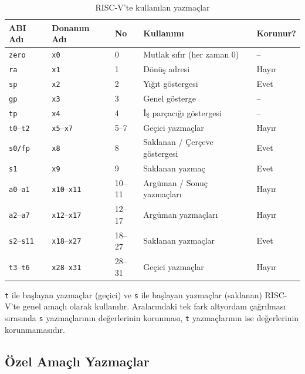 \begin{table}[H]
\centering
\caption{RISC-V'te kullanılan yazmaçlar}
\label{tab:riscv-yazmaclar}
\small
\begin{tabular}{lllp{5.5cm}l}
\toprule
\textbf{ABI Adı} & \textbf{Donanım Adı} & \textbf{No} & \textbf{Kullanımı} & \textbf{Korunur?} \\
\midrule
\texttt{zero}      & \texttt{x0}      & 0     & Mutlak sıfır (her zaman 0)       & -- \\
\texttt{ra}        & \texttt{x1}      & 1     & Dönüş adresi                     & Hayır \\
\texttt{sp}        & \texttt{x2}      & 2     & Yığıt göstergesi                 & Evet \\
\texttt{gp}        & \texttt{x3}      & 3     & Genel gösterge                   & -- \\
\texttt{tp}        & \texttt{x4}      & 4     & İş parçacığı göstergesi          & -- \\
\texttt{t0}--\texttt{t2} & \texttt{x5}--\texttt{x7} & 5--7  & Geçici yazmaçlar          & Hayır \\
\texttt{s0/fp}     & \texttt{x8}      & 8     & Saklanan / Çerçeve göstergesi    & Evet \\
\texttt{s1}        & \texttt{x9}      & 9     & Saklanan yazmaç                  & Evet \\
\texttt{a0}--\texttt{a1} & \texttt{x10}--\texttt{x11} & 10--11 & Argüman / Sonuç yazmaçları & Hayır \\
\texttt{a2}--\texttt{a7} & \texttt{x12}--\texttt{x17} & 12--17 & Argüman yazmaçları        & Hayır \\
\texttt{s2}--\texttt{s11} & \texttt{x18}--\texttt{x27} & 18--27 & Saklanan yazmaçlar      & Evet \\
\texttt{t3}--\texttt{t6} & \texttt{x28}--\texttt{x31} & 28--31 & Geçici yazmaçlar        & Hayır \\
\bottomrule
\end{tabular}
\end{table}

\texttt{t} ile başlayan yazmaçlar (geçici) ve \texttt{s} ile başlayan yazmaçlar (saklanan) RISC-V'te genel amaçlı olarak kullanılır. Aralarındaki tek fark altyordam çağrılması sırasında \texttt{s} yazmaçlarının değerlerinin korunması, \texttt{t} yazmaçlarının ise değerlerinin korunmamasıdır.

\subsection{Özel Amaçlı Yazmaçlar}
\label{subsec:ozel-amacli-yazmaclar}

